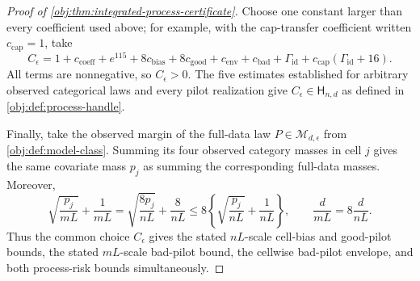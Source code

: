 \documentclass[11pt]{article}
\begin{document}
\begin{proof}[Proof of \cref{obj:thm:integrated-process-certificate}]
Choose one constant larger than every coefficient used above; for example, with the cap-transfer coefficient written \(c_{\mathrm{cap}}=1\), take
\[
C_\epsilon
 =1+c_{\mathrm{coeff}}+e^{115}
   +8c_{\mathrm{bias}}+8c_{\mathrm{good}}
   +c_{\mathrm{env}}+c_{\mathrm{bad}}
   +\Gamma_{\mathrm{id}}
   +c_{\mathrm{cap}}(\Gamma_{\mathrm{id}}+16).
\]
All terms are nonnegative, so \(C_\epsilon>0\). The five estimates established for arbitrary observed categorical laws and every pilot realization give \(C_\epsilon\in\mathsf H_{n,d}\) as defined in \cref{obj:def:process-handle}.

Finally, take the observed margin of the full-data law \(P\in\mathcal M_{d,\epsilon}\) from \cref{obj:def:model-class}. Summing its four observed category masses in cell \(j\) gives the same covariate mass \(p_j\) as summing the corresponding full-data masses. Moreover,
\[
\sqrt{\frac{p_j}{mL}}+\frac1{mL}
 =\sqrt{\frac{8p_j}{nL}}+\frac8{nL}
 \leq8\left\{\sqrt{\frac{p_j}{nL}}+\frac1{nL}\right\},
\qquad
\frac d{mL}=8\frac d{nL}.
\]
Thus the common choice \(C_\epsilon\) gives the stated \(nL\)-scale cell-bias and good-pilot bounds, the stated \(mL\)-scale bad-pilot bound, the cellwise bad-pilot envelope, and both process-risk bounds simultaneously. %
\end{proof}
\end{document}
